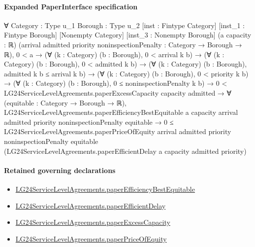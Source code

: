 \documentclass[10pt]{article}
\begin{document}
\paragraph{Expanded PaperInterface specification}
\begin{ReviewVerbatim}
∀ {Category : Type u_1} {Borough : Type u_2} [inst : Fintype Category] [inst_1 : Fintype Borough] [Nonempty Category]
  [inst_3 : Nonempty Borough] (a capacity : ℝ)
  (arrival admitted priority noninspectionPenalty : Category → Borough → ℝ),
  0 < a →
    (∀ (k : Category) (b : Borough), 0 < arrival k b) →
      (∀ (k : Category) (b : Borough), 0 < admitted k b) →
        (∀ (k : Category) (b : Borough), admitted k b ≤ arrival k b) →
          (∀ (k : Category) (b : Borough), 0 < priority k b) →
            (∀ (k : Category) (b : Borough), 0 ≤ noninspectionPenalty k b) →
              0 < LG24ServiceLevelAgreements.paperExcessCapacity capacity admitted →
                ∀ (equitable : Category → Borough → ℝ),
                  LG24ServiceLevelAgreements.paperEfficiencyBestEquitable a capacity arrival admitted priority
                      noninspectionPenalty equitable →
                    0 ≤
                      LG24ServiceLevelAgreements.paperPriceOfEquity arrival admitted priority noninspectionPenalty
                        equitable (LG24ServiceLevelAgreements.paperEfficientDelay a capacity admitted priority)
\end{ReviewVerbatim}

\paragraph{Retained governing declarations}
\begin{itemize}\raggedright
\item \hyperlink{governing-declaration-e3687614c9582751}{LG24\allowbreak{}Service\allowbreak{}Level\allowbreak{}Agreements.\allowbreak{}paper\allowbreak{}Efficiency\allowbreak{}Best\allowbreak{}Equitable}
\item \hyperlink{governing-declaration-70a77d3cfca440a2}{LG24\allowbreak{}Service\allowbreak{}Level\allowbreak{}Agreements.\allowbreak{}paper\allowbreak{}Efficient\allowbreak{}Delay}
\item \hyperlink{governing-declaration-cfc6c9e8c89655cd}{LG24\allowbreak{}Service\allowbreak{}Level\allowbreak{}Agreements.\allowbreak{}paper\allowbreak{}Excess\allowbreak{}Capacity}
\item \hyperlink{governing-declaration-54aa3d28e4e76576}{LG24\allowbreak{}Service\allowbreak{}Level\allowbreak{}Agreements.\allowbreak{}paper\allowbreak{}Price\allowbreak{}Of\allowbreak{}Equity}
\end{itemize}
\end{document}
